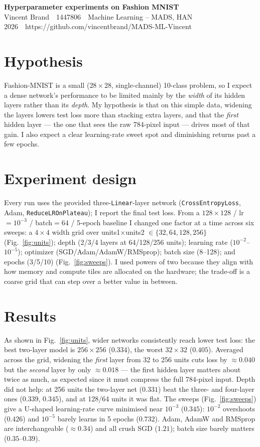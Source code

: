 \documentclass[11pt,a4paper]{article}
\newcommand{\studentname}{Vincent Brand}
\newcommand{\studentnumber}{1447806}
\newcommand{\course}{Machine Learning -- MADS, HAN}
\newcommand{\reportdate}{2026}
\newcommand{\repourl}{https://github.com/vincentbrand/MADS-ML-Vincent}
\begin{document}
\begin{center}
  {\Large\bfseries Hyperparameter experiments on Fashion MNIST}\\[3pt]
  \studentname\ \textbar\ \studentnumber\ \textbar\ \course\\
  \reportdate\ \textbar\ \repourl
\end{center}

\section{Hypothesis}
Fashion-MNIST is a small ($28\times28$, single-channel) 10-class problem, so I
expect a dense network's performance to be limited mainly by the \emph{width} of
its hidden layers rather than its \emph{depth}. My hypothesis is that on this
simple data, widening the layers lowers test loss more than stacking extra
layers, and that the \emph{first} hidden layer --- the one that sees the raw
784-pixel input --- drives most of that gain. I also expect a clear
learning-rate sweet spot and diminishing returns past a few epochs.

\section{Experiment design}
Every run uses the provided three-\texttt{Linear}-layer network
(\texttt{CrossEntropyLoss}, Adam, \texttt{ReduceLROnPlateau}); I report the final
test loss. From a $128\times128$ / lr$=10^{-3}$ / batch$=64$ /
5-epoch baseline I changed one factor at a time across six sweeps: a $4\times4$
width grid over units1$\times$units2 $\in\{32,64,128,256\}$
(Fig.~\ref{fig:units}); depth (2/3/4 layers at 64/128/256 units); learning rate
($10^{-2}$--$10^{-5}$); optimizer (SGD/Adam/AdamW/RMSprop); batch size (8--128);
and epochs (3/5/10) (Fig.~\ref{fig:sweeps}). I used powers of two because they
align with how memory and compute tiles are allocated on the hardware; the
trade-off is a coarse grid that can step over a better value in between.

\section{Results}
As shown in Fig.~\ref{fig:units}, wider networks consistently reach lower test
loss: the best two-layer model is $256\times256$ ($0.334$), the worst
$32\times32$ ($0.405$). Averaged across the grid, widening the \emph{first} layer
from 32 to 256 units cuts loss by $\approx0.040$ but the \emph{second} layer by
only $\approx0.018$ --- the first hidden layer matters about twice as much, as
expected since it must compress the full 784-pixel input. Depth did not help: at
256 units the two-layer net ($0.331$) beat the three- and four-layer ones
($0.339$, $0.345$), and at 128/64 units it was flat. The sweeps
(Fig.~\ref{fig:sweeps}) give a U-shaped learning-rate curve minimised near
$10^{-3}$ ($0.345$): $10^{-2}$ overshoots ($0.426$) and $10^{-5}$ barely learns
in 5 epochs ($0.732$). Adam, AdamW and RMSprop are interchangeable
($\approx0.34$) and all crush SGD ($1.21$); batch size barely matters
($0.35$--$0.39$).
\end{document}
